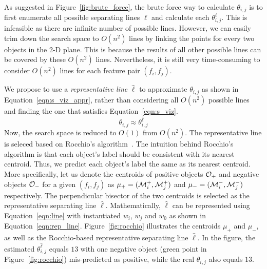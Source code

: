  As suggested in Figure~\ref{fig:brute_force}, the brute force way to calculate $\theta_{i,j}$ is to first enumerate all possible separating lines $\ell$ and calculate each $\theta_{i,j}^\ell$. This is infeasible as there are infinite number of possible lines. However, we can easily trim down the search space to $O(n^2)$ lines by linking the points for every two objects in the 2-D plane. This is because the results of all other possible lines can be covered by these $O(n^2)$ lines. Nevertheless, it is still very time-consuming to consider $O(n^2)$ lines for each feature pair $(f_i,f_j)$. 

 We propose to use a {\em representative line} $\hat{\ell}$ to approximate $\theta_{i, j}$ as shown in Equation~\ref{eqn:s_viz_appr}, rather than considering all $O(n^2)$ possible lines and finding the one that satisfies Equation~\ref{eqn:s_viz}. 
\begin{equation}\label{eqn:s_viz_appr}
\theta_{i,j}  \approx \theta_{i,j}^{\hat{\ell}}
\end{equation}
Now, the search space is reduced to $O(1)$ from $O(n^2)$. The representative line is seleced based on Rocchio's algorithm~\cite{rocchio1971relevance}. 
The intuition behind Rocchio's algorithm is that each object's label should be consistent with its nearest centroid. Thus, we predict each object's label the same as its nearest centroid. More specifically, let us denote the centroids of positive objects $\oo_+$ and negative objects $\oo_-$ for a given $(f_i,f_j)$ as $\mu_+=(\mm_i^+,\mm_j^+)$ and $\mu_-=(\mm_i^-,\mm_j^-)$ respectively. The perpendicular bisector of the two centroids is selected as the representative separating line $\hat{\ell}$. Mathematically, $\hat{\ell}$ can be represented using Equation~\ref{eqn:line} with instantiated $w_i$, $w_j$ and $w_0$ as shown in Equation~\ref{eqn:rep_line}. Figure~\ref{fig:rocchio} illustrates the centroids $\mu_+$ and $\mu_-$, as well as the Rocchio-based representative separating line $\hat{\ell}$. In the figure, the estimated $\theta_{i,j}^{\hat{\ell}}$ equals $13$ with one negative object (green point in Figure~\ref{fig:rocchio}) mis-predicted as positive, while the real $\theta_{i,j}$ also equals $13$.




